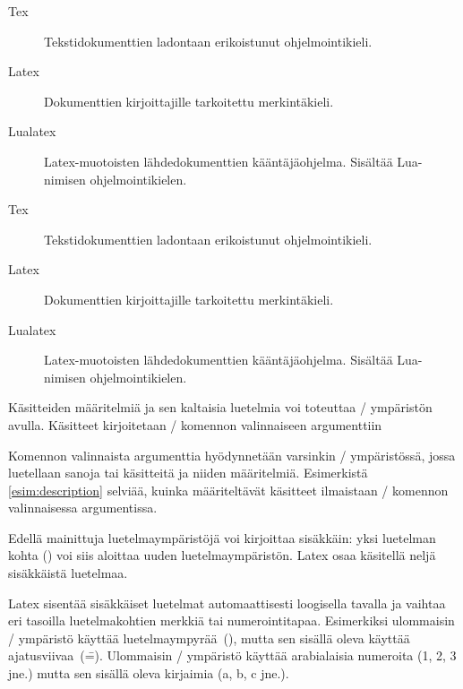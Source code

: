 \begin{esimerkki*}

\begin{koodilohko}
\begin{description}
\item[Tex] Tekstidokumenttien ladontaan erikoistunut ohjelmointikieli.
\item[Latex] Dokumenttien kirjoittajille tarkoitettu merkintäkieli.
\item[Lualatex] Latex-muotoisten lähdedokumenttien kääntäjäohjelma.
  Sisältää Lua-nimisen ohjelmointikielen.
\end{description}
\end{koodilohko}

  \begin{tulos}
    \begin{description}
    \item[Tex] Tekstidokumenttien ladontaan erikoistunut ohjelmointikieli.
    \item[Latex] Dokumenttien kirjoittajille tarkoitettu merkintäkieli.
    \item[Lualatex] Latex-muotoisten lähdedokumenttien kääntäjäohjelma.
      Sisältää Lua-nimi\-sen ohjelmointikielen.
    \end{description}
  \end{tulos}
  \caption{Käsitteiden määritelmiä ja sen kaltaisia luetelmia voi
    toteuttaa \-/ ympäristön avulla. Käsitteet
    kirjoitetaan \-/ komennon valinnaiseen argumenttiin}
  \label{esim:description}
\end{esimerkki*}

Komennon valinnaista argumenttia hyödynnetään varsinkin
\-/ ympäristössä, jossa luetellaan sanoja tai
käsitteitä ja niiden määritelmiä. Esimerkistä \ref{esim:description}
selviää, kuinka määriteltävät käsitteet ilmaistaan \-/
komennon valinnaisessa argumentissa.

Edellä mainittuja luetelmaympäristöjä voi kirjoittaa sisäkkäin: yksi
luetelman kohta () voi siis aloittaa uuden
luetelmaympäristön. Latex osaa käsitellä neljä sisäkkäistä luetelmaa.

Latex sisentää sisäkkäiset luetelmat automaattisesti loogisella tavalla
ja vaihtaa eri tasoilla luetelmakohtien merkkiä tai numerointitapaa.
Esimerkiksi ulommaisin \-/ ympäristö käyttää
luetelmaympyrää~(\textbullet), mutta sen sisällä oleva käyttää
ajatusviivaa~(\==). Ulommaisin \-/ ympäristö
käyttää arabialaisia numeroita (1, 2, 3 jne.) mutta sen sisällä oleva
kirjaimia (a, b, c jne.).

